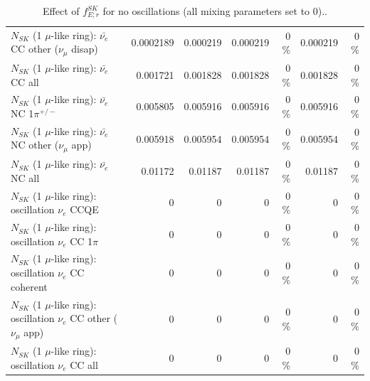 \begin{table}
\begin{tabular}{| l | r | r | r  r | r  r |}
          $N_{SK}$ (1 $\mu$-like ring): $\bar{\nu_e}$ CC other ($\nu_\mu$ disap) &       0.0002189 &        0.000219 &        0.000219 &        0 \%  &        0.000219 &        0 \%  \\ 
                            $N_{SK}$ (1 $\mu$-like ring): $\bar{\nu_{e}}$ CC all &        0.001721 &        0.001828 &        0.001828 &        0 \%  &        0.001828 &        0 \%  \\ 
\hline
                     $N_{SK}$ (1 $\mu$-like ring): $\bar{\nu_e}$ NC 1$\pi^{+/-}$ &        0.005805 &        0.005916 &        0.005916 &        0 \%  &        0.005916 &        0 \%  \\ 
            $N_{SK}$ (1 $\mu$-like ring): $\bar{\nu_e}$ NC other ($\nu_\mu$ app) &        0.005918 &        0.005954 &        0.005954 &        0 \%  &        0.005954 &        0 \%  \\ 
                            $N_{SK}$ (1 $\mu$-like ring): $\bar{\nu_{e}}$ NC all &         0.01172 &         0.01187 &         0.01187 &        0 \%  &         0.01187 &        0 \%  \\ 
\hline
\hline
\hline
                          $N_{SK}$ (1 $\mu$-like ring): oscillation $\nu_e$ CCQE &               0 &               0 &               0 &        0 \%  &               0 &        0 \%  \\ 
                     $N_{SK}$ (1 $\mu$-like ring): oscillation $\nu_e$ CC 1$\pi$ &               0 &               0 &               0 &        0 \%  &               0 &        0 \%  \\ 
                   $N_{SK}$ (1 $\mu$-like ring): oscillation $\nu_e$ CC coherent &               0 &               0 &               0 &        0 \%  &               0 &        0 \%  \\ 
      $N_{SK}$ (1 $\mu$-like ring): oscillation $\nu_e$ CC other ($\nu_\mu$ app) &               0 &               0 &               0 &        0 \%  &               0 &        0 \%  \\ 
                       $N_{SK}$ (1 $\mu$-like ring): oscillation $\nu_e$  CC all &               0 &               0 &               0 &        0 \%  &               0 &        0 \%  \\ 
\hline
\hline
\end{tabular}
\caption{ Effect of $f_{E; r}^{SK}$   for no oscillations (all mixing parameters set to 0).. }
\label{tab:num_sk_energy_scale_1RmuT_3f_osc_t13:0_spectralreco_spectraltrue}
\end{table}
\clearpage
